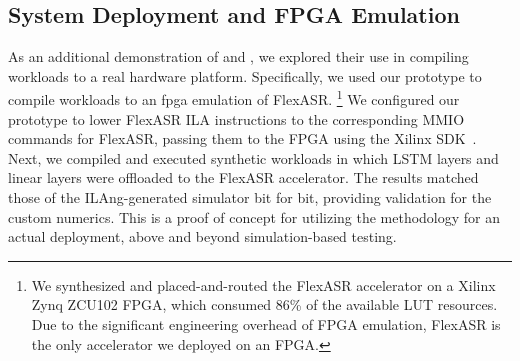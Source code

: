 \subsection{System Deployment and FPGA Emulation}
\label{sec.eval-fpga}

As an additional demonstration of {\TLA} and \g, we explored their use in 
  compiling workloads
  to a real hardware platform.
  Specifically, 
  we used our prototype to compile workloads
  to an \gls{fpga} emulation of FlexASR.%
\footnote{We synthesized and placed-and-routed the FlexASR accelerator on a Xilinx Zynq ZCU102 FPGA, which consumed 86\% of the available LUT resources.
Due to the significant engineering overhead of FPGA emulation, FlexASR is the only accelerator we deployed on an FPGA.}
%
We configured our prototype to lower
 FlexASR ILA instructions
 to the corresponding MMIO commands for FlexASR, %
 passing them to the FPGA using the Xilinx SDK~\cite{xsdk}.
%
Next, we compiled and executed synthetic workloads in which LSTM layers and linear layers were offloaded to the FlexASR accelerator.
The results matched those of the ILAng-generated simulator bit for bit, providing validation for %
the custom numerics.
This is a proof of concept for utilizing the {\TLA} methodology for an actual deployment, above and beyond simulation-based testing.
%

